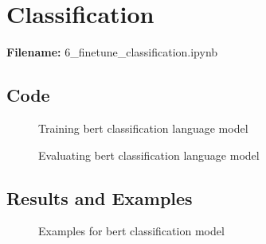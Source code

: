 \documentclass[12pt, a4paper]{article}
\begin{document}
\section*{Classification}
\large{\textbf{Filename:} 6\_finetune\_classification.ipynb}

\subsection*{Code}

\begin{figure}[H]
	\caption{Training bert classification language model}
	\label{classification-lm_train}
\end{figure}

\begin{figure}[H]
	\caption{Evaluating bert classification language model}
	\label{classification-lm_eval}
\end{figure}

\subsection*{Results and Examples}
\begin{figure}[H]
	\caption{Examples for bert classification model}
	\label{classification-lm_examples}
\end{figure}
\end{document}
